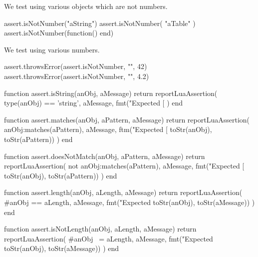 We test using various objects which are not numbers. 

\startLuaTest
  assert.isNotNumber("aString")
  assert.isNotNumber({ "aTable" })
  assert.isNotNumber(function() end)
\stopLuaTest
\stopTestCase


We test using various numbers.

\startLuaTest
  assert.throwsError(assert.isNotNumber, "", 42)
  assert.throwsError(assert.isNotNumber, "", 4.2)
\stopLuaTest
\stopTestCase

\stopTestSuite


\startLuaCode
function assert.isString(anObj, aMessage)
  return reportLuaAssertion(
    type(anObj) == 'string',
    aMessage,
    fmt("Expected [%
  )
end
\stopLuaCode

\stopTestSuite


\startLuaCode
function assert.matches(anObj, aPattern, aMessage)
  return reportLuaAssertion(
    anObj:matches(aPattern),
    aMessage,
    ftm("Expected [%
      toStr(anObj), toStr(aPattern))
  )
end
\stopLuaCode

\stopTestSuite


\startLuaCode
function assert.doesNotMatch(anObj, aPattern, aMessage)
  return reportLuaAssertion(
    not anObj:matches(aPattern),
    aMessage,
    fmt("Expected [%
      toStr(anObj), toStr(aPattern))
  )
end
\stopLuaCode

\stopTestSuite


\startLuaCode
function assert.length(anObj, aLength, aMessage)
  return reportLuaAssertion(
    #anObj == aLength,
    aMessage,
    fmt("Expected %
      toStr(anObj), toStr(aMessage))
  )
end
\stopLuaCode

\stopTestSuite


\startLuaCode
function assert.isNotLength(anObj, aLength, aMessage)
  return reportLuaAssertion(
    #anObj ~= aLength,
    aMessage,
    fmt("Expected %
      toStr(anObj), toStr(aMessage))
  )
end
\stopLuaCode

